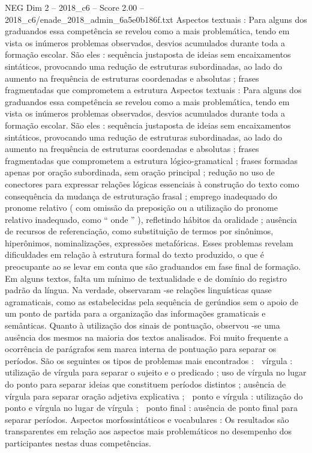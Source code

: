 \begin{textsample}{NEG Dim 2 – 2018\_c6 – Score 2.00 – 2018\_c6/enade\_2018\_admin\_6a5e0b186f.txt}
Aspectos textuais : Para alguns dos graduandos essa competência se revelou como a mais problemática, tendo em vista os inúmeros problemas observados, desvios acumulados durante toda a formação escolar.
São eles : sequência justaposta de ideias sem encaixamentos sintáticos, provocando uma redução de estruturas subordinadas, ao lado do aumento na frequência de estruturas coordenadas e absolutas ; frases fragmentadas que comprometem a estrutura Aspectos textuais : Para alguns dos graduandos essa competência se revelou como a mais problemática, tendo em vista os inúmeros problemas observados, desvios acumulados durante toda a formação escolar.
São eles : sequência justaposta de ideias sem encaixamentos sintáticos, provocando uma redução de estruturas subordinadas, ao lado do aumento na frequência de estruturas coordenadas e absolutas ; frases fragmentadas que comprometem a estrutura lógico-gramatical ; frases formadas apenas por oração subordinada, sem oração principal ; redução no uso de conectores para expressar relações lógicas essenciais à construção do texto como consequência da mudança de estruturação frasal ; emprego inadequado do pronome relativo ( com omissão da preposição ou a utilização do pronome relativo inadequado, como “ onde ” ), refletindo hábitos da oralidade ; ausência de recursos de referenciação, como substituição de termos por sinônimos, hiperônimos, nominalizações, expressões metafóricas.
Esses problemas revelam dificuldades em relação à estrutura formal do texto produzido, o que é preocupante ao se levar em conta que são graduandos em fase final de formação.
Em alguns textos, falta um mínimo de textualidade e de domínio do registro padrão da língua.
Na verdade, observaram -se relações linguísticas quase agramaticais, como as estabelecidas pela sequência de gerúndios sem o apoio de um ponto de partida para a organização das informações gramaticais e semânticas.
Quanto à utilização dos sinais de pontuação, observou -se uma ausência dos mesmos na maioria dos textos analisados.
Foi muito frequente a ocorrência de parágrafos sem marca interna de pontuação para separar os períodos.
São os seguintes os tipos de problemas mais encontrados :  vírgula : utilização de vírgula para separar o sujeito e o predicado ; uso de vírgula no lugar do ponto para separar ideias que constituem períodos distintos ; ausência de vírgula para separar oração adjetiva explicativa ;  ponto e vírgula : utilização do ponto e vírgula no lugar de vírgula ;  ponto final : ausência de ponto final para separar períodos.
Aspectos morfossintáticos e vocabulares : Os resultados são transparentes em relação aos aspectos mais problemáticos no desempenho dos participantes nestas duas competências.

\end{textsample}
